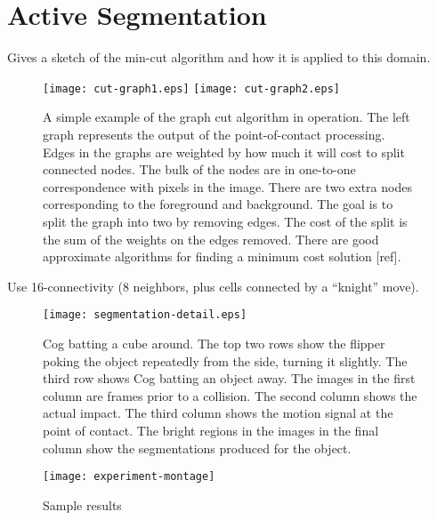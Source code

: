 
\section{Active Segmentation}

Gives a sketch of the min-cut algorithm and how it is applied to
this domain.

\begin{figure*}[tbh]
\begin{center}
\texttt{[image: cut-graph1.eps]}
\hspace{1cm}
\texttt{[image: cut-graph2.eps]}
\caption{ 
\label{fig:cut-graph}
%
A simple example of the graph cut algorithm in operation.  
The left graph represents the output of the point-of-contact 
processing.  Edges in the graphs are weighted by how much
it will cost to split connected nodes.  The bulk of the nodes
are in one-to-one correspondence with pixels in the image.
There are two extra nodes corresponding to the foreground and
background.  The goal is to split the graph into two by removing
edges.  The cost of the split is the sum of the weights on the 
edges removed.  There are good approximate algorithms for
finding a minimum cost solution [ref].
%
}
\end{center}
\end{figure*}

Use 16-connectivity (8 neighbors, plus cells connected by a
``knight'' move).

%
\begin{figure}[tb]
\begin{center}
\texttt{[image: segmentation-detail.eps]}
\caption{ 
\label{fig:poking-segmentation}
%
Cog batting a cube around.  The top two rows show the flipper poking
the object repeatedly from the side, turning it slightly.  The third
row shows Cog batting an object away.  The images in the first column
are frames prior to a collision.  The second column shows the actual
impact.  The third column shows the motion signal at the point of
contact.  The bright regions in the images in the final column show
the segmentations produced for the object. 
%
}
\end{center}
\end{figure}
%

\begin{figure}[tbh]
  \centerline{\texttt{[image: experiment-montage]}}
  \caption{Sample results}
  \label{fig:sample-results}
\end{figure}

